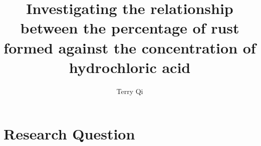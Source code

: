 \documentclass[a4paper,12pt]{article}
\title{Investigating the relationship between the percentage of rust formed against the concentration of hydrochloric acid}
\author{Terry Qi}
\begin{document}
\maketitle

\section{Research Question}
\end{document}
